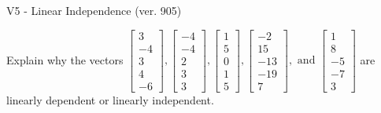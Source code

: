 \begin{exercise}
  \begin{exerciseTitle}V5 - Linear Independence (ver. 905)\end{exerciseTitle}
  \begin{exerciseStatement}
    Explain why the vectors \(\left[\begin{array}{r}
3 \\
-4 \\
3 \\
4 \\
-6
\end{array}\right] , \left[\begin{array}{r}
-4 \\
-4 \\
2 \\
3 \\
3
\end{array}\right] , \left[\begin{array}{r}
1 \\
5 \\
0 \\
1 \\
5
\end{array}\right] , \left[\begin{array}{r}
-2 \\
15 \\
-13 \\
-19 \\
7
\end{array}\right] , \text{ and } \left[\begin{array}{r}
1 \\
8 \\
-5 \\
-7 \\
3
\end{array}\right]\) are linearly dependent or linearly independent.	



\end{exerciseStatement}
\end{exercise}
